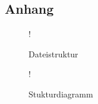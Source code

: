 \begin{appendix}
\section{Anhang}
%
\begin{figure}[H]
\resizebox {0.2\columnwidth} {!} {
  
  \label{abl:file_tree}
}
\caption{Dateistruktur}
\end{figure}

\begin{figure}[H]
\centering
\resizebox {\columnwidth} {!} {
  
  \label{abl:struct_diagramm}
}
\caption{Stukturdiagramm}
\end{figure}

\end{appendix}
